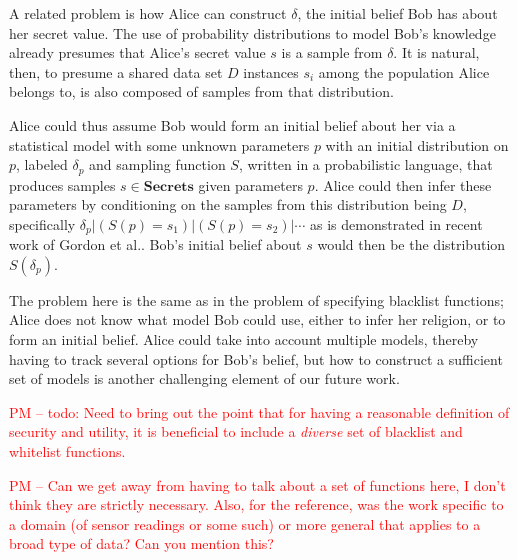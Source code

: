 \documentclass{article} %
\newcommand{\pxm}[1]{\textcolor{red}{PM -- #1}}
\newcommand{\secrets}[0]{\textbf{Secrets}}
\newcommand{\asecret}[0]{s}
\newcommand{\rsecret}[0]{s}
\newcommand{\cond}[0]{|}
\theoremstyle{plain} %
\theoremstyle{definition} %
\begin{document}
A related problem is how Alice can construct $ \delta $, the initial
belief Bob has about her secret value. The use of probability
distributions to model Bob's knowledge already presumes that Alice's
secret value $ \rsecret $ is a sample from $ \delta $. It is natural,
then, to presume a shared data set $ D $ instances $ \asecret_i $ among the
population Alice belongs to, is also composed of samples from that
distribution.

Alice could thus assume Bob would form an initial belief about her via
a statistical model with some unknown parameters $ p $ with an initial
distribution on $ p $, labeled $ \delta_p $ and sampling function $ S
$, written in a probabilistic language, that produces samples $
\asecret \in \secrets $ given parameters $ p $. Alice could then infer
these parameters by conditioning on the samples from this distribution
being $ D $, specifically $ \delta_p \cond (S(p) = \asecret_1) \cond
(S(p) = \asecret_2) \cond \cdots $ as is demonstrated in recent work
of Gordon et al.\cite{gordon13model}. Bob's initial belief about $
\rsecret $ would then be the distribution $ S(\delta_p) $.

The problem here is the same as in the problem of specifying blacklist
functions; Alice does not know what model Bob could use, either to
infer her religion, or to form an initial belief. Alice could take
into account multiple models, thereby having to track several options
for Bob's belief, but how to construct a sufficient set of models is
another challenging element of our future work.


\pxm{todo: Need to bring out the point that for  having a reasonable
definition of security and utility, it is beneficial to include a
\emph{diverse} set of blacklist and whitelist functions.}

\pxm{Can we get away from having to talk about a set of functions
  here, I don't think they are strictly necessary. Also, for the
  reference, was the work specific to a domain (of sensor readings or
  some such) or more general that applies to a broad type of data?
  Can you mention this?}
\end{document}
